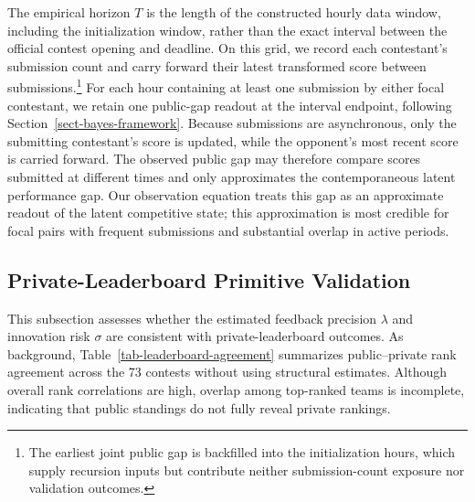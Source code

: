 \documentclass[mnsc]{informs3}
\begin{document}
The empirical horizon $T$ is the length of the constructed hourly data window, including the initialization window, rather than the exact interval between the official contest opening and deadline. On this grid, we record each contestant's submission count and carry forward their latest transformed score between submissions.\footnote{The earliest joint public gap is backfilled into the initialization hours, which supply recursion inputs but contribute neither submission-count exposure nor validation outcomes.} For each hour containing at least one submission by either focal contestant, we retain one public-gap readout at the interval endpoint, following Section~\ref{sect-bayes-framework}.
Because submissions are asynchronous, only the submitting contestant’s score is updated, while the opponent’s most recent score is carried forward. 
The observed public gap may therefore compare scores submitted at different times and only approximates the contemporaneous latent performance gap.
Our observation equation treats this gap as an approximate readout of the latent competitive state; this approximation is most credible for focal pairs with frequent submissions and substantial overlap in active periods.



\subsection{Private-Leaderboard Primitive Validation}\label{sect-validation}

{This subsection assesses whether the estimated feedback precision $\lambda$ and innovation risk $\sigma$ are consistent with private-leaderboard outcomes. As background, Table~\ref{tab-leaderboard-agreement} summarizes public--private rank agreement across the 73 contests without using structural estimates. Although overall rank correlations are high, overlap among top-ranked teams is incomplete, indicating that public standings do not fully reveal private rankings.}
\end{document}
